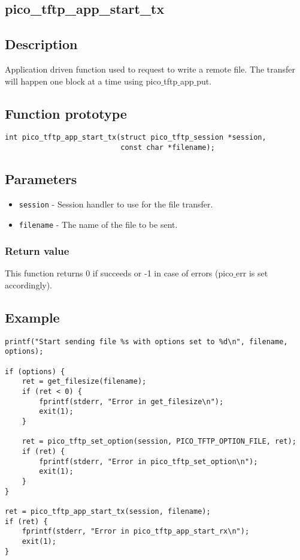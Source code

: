 \subsection{pico\_tftp\_app\_start\_tx}

\subsection*{Description}
Application driven function used to request to write a remote file. The transfer will happen one block at a time using pico$\_$tftp$\_$app$\_$put.

\subsection*{Function prototype}
\begin{verbatim}
int pico_tftp_app_start_tx(struct pico_tftp_session *session,
                           const char *filename);
\end{verbatim}

\subsection*{Parameters}
\begin{itemize}[noitemsep]
\item \texttt{session} - Session handler to use for the file transfer.
\item \texttt{filename} - The name of the file to be sent.
\end{itemize}

\subsubsection*{Return value}
This function returns 0 if succeeds or -1 in case of errors (pico$\_$err is set accordingly).

\subsection*{Example}
\begin{verbatim}
printf("Start sending file %s with options set to %d\n", filename, options);

if (options) {
    ret = get_filesize(filename);
    if (ret < 0) {
        fprintf(stderr, "Error in get_filesize\n");
        exit(1);
    }

    ret = pico_tftp_set_option(session, PICO_TFTP_OPTION_FILE, ret);
    if (ret) {
        fprintf(stderr, "Error in pico_tftp_set_option\n");
        exit(1);
    }
}

ret = pico_tftp_app_start_tx(session, filename);
if (ret) {
    fprintf(stderr, "Error in pico_tftp_app_start_rx\n");
    exit(1);
}
\end{verbatim}


